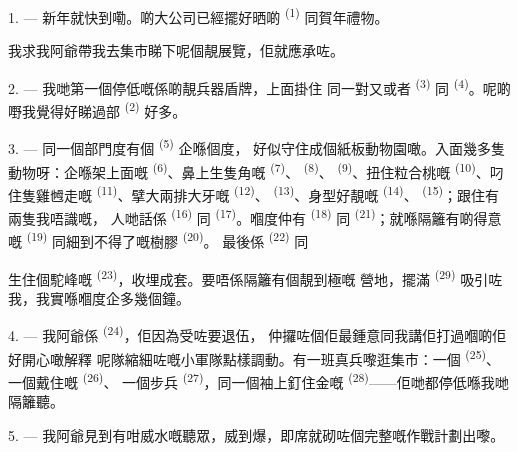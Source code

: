 1. --- 新年就快到嘞。啲大公司已經擺好晒啲 \textsuperscript{(1)} 同賀年禮物。

我求我阿爺帶我去集市睇下呢個靚展覽，佢就應承咗。

2. --- 我哋第一個停低嘅係啲靚兵器盾牌，上面掛住
同一對又或者
\textsuperscript{(3)} 同 \textsuperscript{(4)}。呢啲嘢我覺得好睇過部
 \textsuperscript{(2)} 好多。

\VUsaut{3.0mm}
\VUsaut{2.6mm}

3. --- 同一個部門度有個 \textsuperscript{(5)} 企喺個度，
好似守住成個紙板動物園噉。入面幾多隻動物呀：企喺架上面嘅
\textsuperscript{(6)}、鼻上生隻角嘅 \textsuperscript{(7)}、
\textsuperscript{(8)}、 \textsuperscript{(9)}、扭住粒合桃嘅
\textsuperscript{(10)}、叼住隻雞乸走嘅 \textsuperscript{(11)}、擘大兩排大牙嘅
 \textsuperscript{(12)}、 \textsuperscript{(13)}、身型好靚嘅
 \textsuperscript{(14)}、 \textsuperscript{(15)}；跟住有兩隻我唔識嘅，
人哋話係 \textsuperscript{(16)} 同 \textsuperscript{(17)}。嗰度仲有
 \textsuperscript{(18)} 同 \textsuperscript{(21)}；就喺隔籬有啲得意嘅
 \textsuperscript{(19)} 同細到不得了嘅樹膠 \textsuperscript{(20)}。
最後係 \textsuperscript{(22)} 同

生住個駝峰嘅 \textsuperscript{(23)}，收埋成套。要唔係隔籬有個靚到極嘅
營地，擺滿 \textsuperscript{(29)} 吸引咗我，我實喺嗰度企多幾個鐘。

\VUsaut{4.0mm}
\VUsaut{2.8mm}

4. --- 我阿爺係 \textsuperscript{(24)}，佢因為受咗要退伍，
仲攞咗個佢最鍾意同我講佢打過嗰啲佢好開心噉解釋
呢隊縮細咗嘅小軍隊點樣調動。有一班真兵嚟逛集市：一個
\textsuperscript{(25)}、一個戴住嘅 \textsuperscript{(26)}、
一個步兵 \textsuperscript{(27)}，同一個袖上釘住金嘅
 \textsuperscript{(28)}——佢哋都停低喺我哋隔籬聽。

5. --- 我阿爺見到有咁威水嘅聽眾，威到爆，即席就砌咗個完整嘅作戰計劃出嚟。

